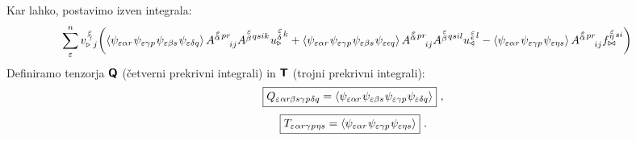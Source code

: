 Kar lahko, postavimo izven integrala:
\begin{equation*}
   \mkern-20mu \sum^n_\varepsilon
   v^{\mkern 2mu \substack{\varepsilon \\[-0.65mm] \gamma \\[-0.2mm]}}_{\triangleright \mkern5mu j}
   \qty( \expval{
      \psi_{ \varepsilon \alpha r} \mkern1mu
      \psi_{\varepsilon \gamma p} \mkern1mu
      \psi_{\varepsilon \beta s} \mkern1mu
      \psi_{\varepsilon \delta q} }
   A^{\substack{\mkern2mu \varepsilon \\[-0.65mm] \alpha} \mkern2mu p r}_{\mkern29mu i j}
   A^{\substack{\mkern2mu \varepsilon \\[0.05mm] \beta} \mkern2mu q s i k} \mkern1mu
   u^{\substack{\mkern2mu \varepsilon \\[0.09mm] \delta} \mkern2mu k}_\triangleright
   +
   \expval{
      \psi_{ \varepsilon \alpha r} \mkern1mu
      \psi_{\varepsilon \gamma p} \mkern1mu
      \psi_{\varepsilon \beta s} \mkern1mu
      \psi_{\varepsilon \epsilon q} }
   A^{\substack{\mkern2mu \varepsilon \\[-0.65mm] \alpha} \mkern2mu p r}_{\mkern29mu i j}
   A^{\substack{\mkern2mu \varepsilon \\[0.05mm] \beta} \mkern2mu q s i l}
   u^{\substack{\mkern2mu \varepsilon \\[-0.55mm] \epsilon} \mkern2mu l}_\triangleleft
   -
   \expval{
      \psi_{ \varepsilon \alpha r} \mkern1mu
      \psi_{\varepsilon \gamma p} \mkern1mu
      \psi_{\varepsilon \eta s} }
   A^{\substack{\mkern2mu \varepsilon \\[-0.65mm] \alpha} \mkern2mu p r}_{\mkern29mu i j}
   f^{\substack{\mkern2mu \varepsilon \\[-0.59mm] \eta} \mkern2mu s i}_{\bowtie} )
\end{equation*}
Definiramo tenzorja $\bm{\mathsf{Q}}$ (četverni prekrivni integrali) in $\bm{\mathsf{T}}$ (trojni prekrivni integrali):
\begin{equation}
   \boxed{
   Q_{\varepsilon \mkern1mu  \alpha r  \mkern-1mu \beta s   \gamma \mkern1mu p \mkern1mu  \delta q}
   =
   \expval{
      \psi_{ \varepsilon   \alpha r} \mkern1mu
      \psi_{ \varepsilon   \beta s} \mkern1mu
      \psi_{ \varepsilon   \gamma p} \mkern1mu
      \psi_{ \varepsilon   \delta q} } } \ ,
\end{equation}
\begin{equation}
   \boxed{
   T_{\varepsilon \mkern1mu  \alpha r   \gamma \mkern1mu p  \mkern1mu \eta s}
   =
   \expval{
      \psi_{\varepsilon \alpha r} \mkern1mu
      \psi_{\varepsilon \gamma p} \mkern1mu
      \psi_{ \varepsilon \eta s} } } \ .
\end{equation}

